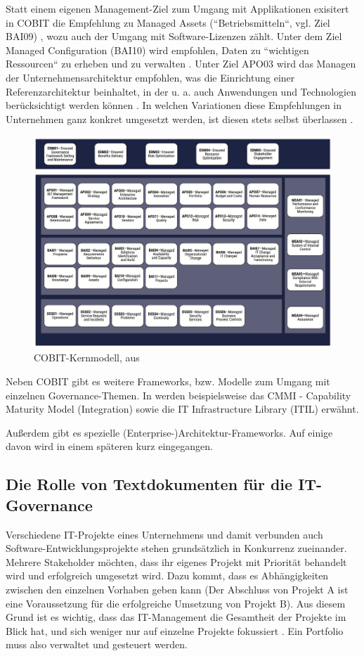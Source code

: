 Statt einem eigenen Management-Ziel zum Umgang mit Applikationen exisitert in COBIT die Empfehlung zu Managed Assets (``Betriebsmitteln``, vgl. Ziel BAI09) \cite[S. 209-214]{isaca1}, wozu auch der Umgang mit Software-Lizenzen zählt. Unter dem Ziel Managed Configuration (BAI10) wird empfohlen, Daten zu ``wichtigen Ressourcen`` zu erheben und zu verwalten \cite[S. 73]{gaulke}. Unter Ziel APO03 wird das Managen der Unternehmensarchitektur empfohlen, was die Einrichtung einer Referenzarchitektur beinhaltet, in der u. a. auch Anwendungen und Technologien berücksichtigt werden können \cite[S. 70]{gaulke}. In welchen Variationen diese Empfehlungen in Unternehmen ganz konkret umgesetzt werden, ist diesen stets selbst überlassen \cite[S. 65]{gaulke}.
 
\begin{figure}[h]
\centering
\includegraphics[scale=0.9]{content/pics/Picture_7.png}
\caption{COBIT-Kernmodell, aus \cite[S. 21]{isaca2}}
\label{Abbildung:isaca}
\end{figure}

Neben COBIT gibt es weitere Frameworks, bzw. Modelle zum Umgang mit einzelnen Governance-Themen. In \cite[S. 127-133]{gaulke} werden beispielsweise das CMMI - Capability Maturity Model (Integration) sowie die IT Infrastructure Library (ITIL) erwähnt. 
 
Außerdem gibt es spezielle (Enterprise-)Architektur-Frameworks. Auf einige davon wird in einem späteren kurz eingegangen. 

\subsection{Die Rolle von Textdokumenten für die IT-Governance}
Verschiedene IT-Projekte eines Unternehmens und damit verbunden auch Software-Entwicklungsprojekte stehen grundsätzlich in Konkurrenz zueinander. Mehrere Stakeholder möchten, dass ihr eigenes Projekt mit Priorität behandelt wird und erfolgreich umgesetzt wird. Dazu kommt, dass es Abhängigkeiten zwischen den einzelnen Vorhaben geben kann (Der Abschluss von Projekt A ist eine Voraussetzung für die erfolgreiche Umsetzung von Projekt B). Aus diesem Grund ist es wichtig, dass das IT-Management die Gesamtheit der Projekte im Blick hat, und sich weniger nur auf einzelne Projekte fokussiert \cite[S. 1]{frey}. Ein Portfolio muss also verwaltet und gesteuert werden.

